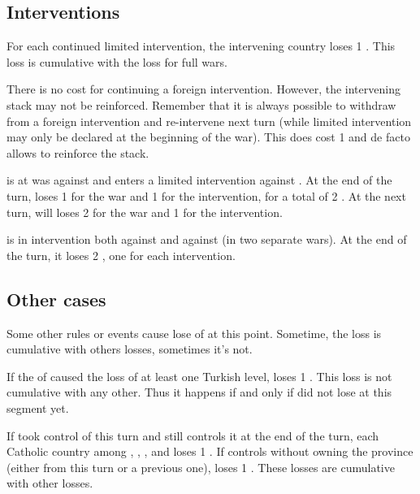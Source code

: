 \subsection{Interventions}
\bparag For each continued limited intervention, the intervening country loses
1 \STAB.
\bparag This loss is cumulative with the loss for full wars.

\bparag There is no cost for continuing a foreign intervention. However, the
intervening stack may not be reinforced.
\bparag Remember that it is always possible to withdraw from a foreign
intervention and re-intervene next turn (while limited intervention may only
be declared at the beginning of the war). This does cost 1 \STAB and de facto
allows to reinforce the stack.

\begin{exemple}[Interventions]
  \FRA is at was against \HIS and enters a limited intervention against
  \ANG. At the end of the turn, \FRA loses 1 \STAB for the war and 1 for the
  intervention, for a total of 2 \STAB. At the next turn, \FRA will loses
  2 \STAB for the war and 1 for the intervention.

  \ANG is in intervention both against \FRA and against \AUS (in two separate
  wars). At the end of the turn, it loses 2 \STAB, one for each intervention.
\end{exemple}

\subsection{Other cases}
\aparag Some other rules or events cause lose of \STAB at this point.
\bparag Sometime, the loss is cumulative with others losses, sometimes it's
not.

\bparag If the \corsaire of \paysChevaliers caused the loss of at least one
Turkish \TradeFLEET level, \TUR loses 1 \STAB.
\bparag This loss is not cumulative with any other. Thus it happens if and
only if \TUR did not lose \STAB at this segment yet.

\aparag[\villeVienne]
\bparag If \TUR took control of \villeVienne this turn and still controls it
at the end of the turn, each Catholic country among \HIS, \AUS, \POL, \FRA and
\ANG loses 1 \STAB.
\bparag If \TUR controls \villeVienne without owning the province (either from
this turn or a previous one), \HAB loses 1 \STAB.
\bparag These losses are cumulative with other losses.

